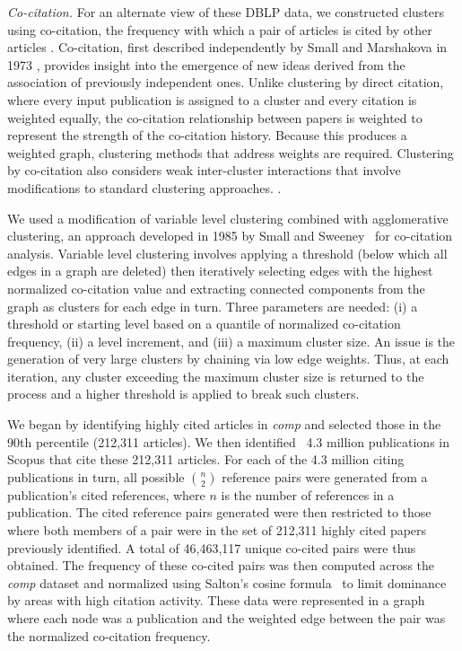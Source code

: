 \emph{Co-citation.} For an alternate view of these DBLP data, we constructed clusters using co-citation, the frequency with which a pair of articles is cited by other articles \cite{small_co-citation_1973,marshakova-shaikevich_co-citation_1973}. Co-citation, first described independently by Small and Marshakova in 1973 \cite{marshakova-shaikevich_co-citation_1973}, provides insight into the emergence of new ideas derived from the association of previously independent ones. Unlike clustering by direct citation, where every input publication is assigned to a cluster and every citation is weighted equally, the co-citation relationship between papers is weighted to represent the strength of the co-citation history. Because this produces a weighted graph, clustering methods that address weights are required. Clustering by co-citation also considers weak inter-cluster interactions that involve modifications to standard clustering approaches. \cite{boyack_cocitation_2010,boyack_improving_2013,small_structure_1974,small_clustering_1985}. 

We used a modification of variable level clustering combined with agglomerative clustering, an approach developed in 1985 by Small and Sweeney~\cite{small_clustering_1985} for co-citation analysis.
Variable level clustering involves applying a threshold (below which all edges in a graph are deleted) then iteratively selecting edges with the highest normalized co-citation value and extracting connected components from the graph as clusters for each edge in turn. Three parameters are needed: (i) a threshold or starting level based on a quantile of normalized co-citation frequency, (ii) a level increment, and (iii) a maximum cluster size. An issue is the generation of very large clusters by chaining via low edge weights.  Thus, at each iteration, any cluster exceeding the maximum cluster size  is returned to the process and a higher threshold is applied to break such clusters.

We began by identifying highly cited articles in \emph{comp} and selected those in the 90th percentile (212,311 articles). We then identified ~4.3 million publications in Scopus that cite these 212,311 articles. For each of the 4.3 million citing publications in turn, 
all possible ${n \choose 2}$ reference pairs were generated from a publication's cited references, where $n$ is the number of references in a publication. The cited reference pairs generated were then restricted to those where both members of a pair were in the 
set of 212,311 highly cited papers previously identified. A total of 46,463,117 unique co-cited pairs were thus obtained. The frequency of these co-cited pairs was then computed across the \emph{comp} dataset  and normalized using Salton's cosine 
formula~\cite{salton_citation_1979} to limit dominance by areas with high citation activity. These data were represented in a graph where each node was a publication and the weighted edge between the pair was the normalized co-citation frequency. 

